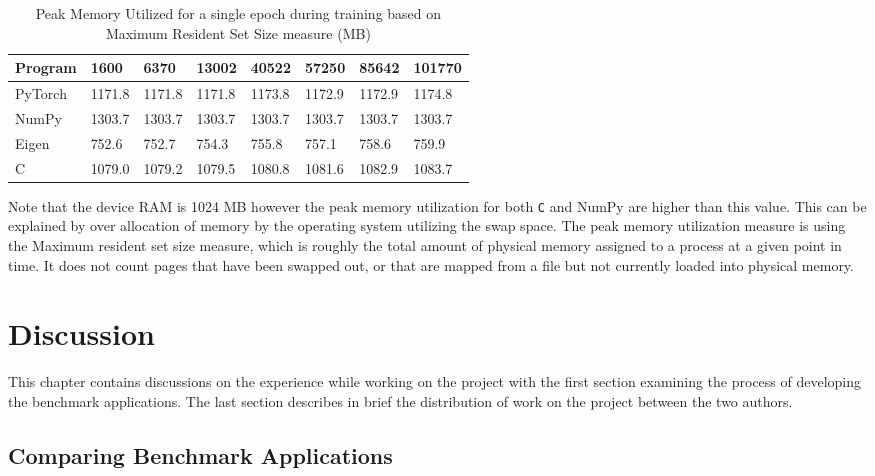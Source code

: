 \begin{table}[h]
	\centering
	\begin{tabular}{ |p{4em}|p{3em}|p{3em}|p{3em}|p{3em}|p{3em}|p{3em}|p{3em}| }
		\hline
		\textbf{Program} & \textbf{1600} & \textbf{6370} & \textbf{13002} & \textbf{40522} & \textbf{57250} & \textbf{85642} & \textbf{101770} \\
		\hline
		PyTorch & 1171.8 & 1171.8 & 1171.8 & 1173.8 & 1172.9 & 1172.9 & 1174.8 \\
		\hline
		NumPy & 1303.7 & 1303.7 & 1303.7 & 1303.7 & 1303.7 & 1303.7 & 1303.7 \\
		\hline
		Eigen & 752.6 & 752.7 & 754.3 & 755.8 & 757.1 & 758.6 & 759.9 \\
		\hline
		C & 1079.0 & 1079.2 & 1079.5 & 1080.8 & 1081.6 & 1082.9 & 1083.7\\
		\hline
	\end{tabular}
	\caption[Peak Memory Utilization]{Peak Memory Utilized for a single epoch during training based on Maximum Resident Set Size measure (MB)}
\end{table}

Note that the device RAM is 1024 MB however the peak memory utilization for both \texttt{C} and NumPy are higher than this value. This can be explained by over allocation of memory by the operating system utilizing the swap space. The peak memory utilization measure is using the Maximum resident set size measure, which is roughly the total amount of physical memory assigned to a process at a given point in time. It does not count pages that have been swapped out, or that are mapped from a file but not currently loaded into physical memory.


\chapter{Discussion}

This chapter contains discussions on the experience while working on the project with the first section examining the process of developing the benchmark applications. The last section describes in brief the distribution of work on the project between the two authors.


\section{Comparing Benchmark Applications}

